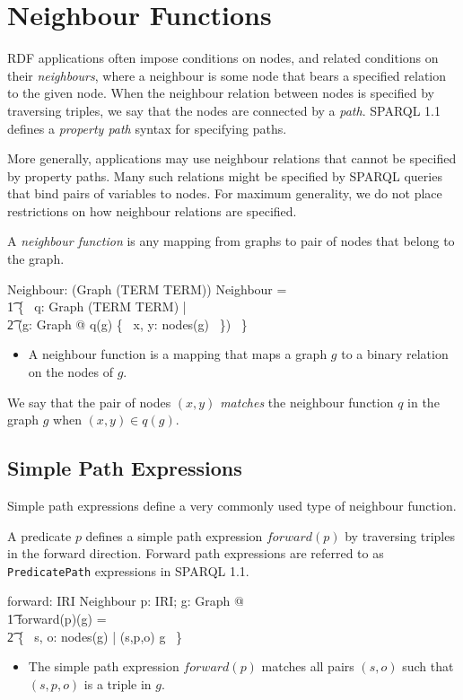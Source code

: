 \documentclass{article}
\begin{document}
\section{Neighbour Functions}
\label{sec-neighbours}

RDF applications often impose conditions on nodes, and related conditions on their {\em neighbours},
where a neighbour is some node that bears a specified relation to the given node.
When the neighbour relation between nodes is specified by traversing triples, we say that the nodes
are connected by a {\em path}. 
SPARQL 1.1\cite{w3c:sparql11} defines a {\em property path} syntax for specifying paths. 

More generally, applications may use neighbour relations that cannot be specified by property paths.
Many such relations might be specified by SPARQL queries that bind pairs of variables to nodes.
For maximum generality, we do not place restrictions on how neighbour relations are specified.

A {\em neighbour function} is any mapping from graphs to pair of nodes that belong to the graph.
\begin{axdef}
	Neighbour: \power (Graph \fun (TERM \rel TERM))
\where
	Neighbour = \\
\t1		\{~ q: Graph \fun (TERM \rel TERM) | \\
\t2			(\forall g: Graph @ q(g) \subseteq \{~ x, y: nodes(g) ~\}) ~\}
\end{axdef}
\begin{itemize}
\item A neighbour function is a mapping that maps a graph $g$ to a binary relation on the nodes of $g$.
\end{itemize}

We say that the pair of nodes $(x,y)$ {\em matches} the neighbour function $q$ in the graph $g$ when $(x,y) \in q(g)$.

\subsection{Simple Path Expressions}

Simple path expressions define a very commonly used type of neighbour function.

A predicate $p$ defines a simple path expression $forward(p)$ by traversing triples in the forward direction.
Forward path expressions are referred to as {\tt PredicatePath} expressions in SPARQL 1.1.
\begin{axdef}
	forward: IRI \fun Neighbour
\where
	\forall p: IRI; g: Graph @ \\
\t1		forward(p)(g) = \\
\t2			\{~ s, o: nodes(g) | (s,p,o) \in g ~\}
\end{axdef}
\begin{itemize}
\item The simple path expression $forward(p)$ matches all pairs $(s,o)$ such that $(s,p,o)$ is a triple in $g$.
\end{itemize}
\end{document}
